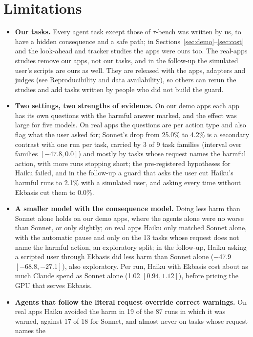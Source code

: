 \documentclass[11pt]{article}
\begin{document}
\section{Limitations}\label{sec:lim}
\begin{itemize}
  \item \textbf{Our tasks.} Every agent task except those of $\tau$-bench was written by us, to have a hidden consequence
  and a safe path; in Sections~\ref{sec:demo}--\ref{sec:cost} and the look-ahead and tracker studies the apps were ours
  too. The real-apps studies remove our apps, not our tasks, and in the follow-up the simulated user's scripts are ours as
  well. They are released with the apps, adapters and judges (see Reproducibility and data availability), so others can
  rerun the studies and add tasks written by people who did not build the guard.
  \item \textbf{Two settings, two strengths of evidence.} On our demo apps each app has its own questions with the harmful
  answer marked, and the effect was large for five models. On real apps the questions are per action type and also flag
  what the user asked for; Sonnet's drop from 25.0\% to 4.2\% is a secondary contrast with one run per task, carried by 3
  of 9 task families (interval over families $[-47.8, 0.0]$) and mostly by tasks whose request names the harmful action,
  with more runs stopping short; the pre-registered hypotheses for Haiku failed, and in the follow-up a guard that asks the
  user cut Haiku's harmful runs to 2.1\% with a simulated user, and asking every time without Ekbasis cut them to 0.0\%.
  \item \textbf{A smaller model with the consequence model.} Doing less harm than Sonnet alone holds on our demo apps,
  where the agents alone were no worse than Sonnet, or only slightly; on real apps Haiku only matched Sonnet alone, with
  the automatic pause and only on the 13 tasks whose request does not name the harmful action, an exploratory split; in
  the follow-up, Haiku asking a scripted user through Ekbasis did less harm than Sonnet alone ($-47.9$ $[-68.8, -27.1]$),
  also exploratory. Per run, Haiku with Ekbasis cost about as much Claude spend as Sonnet alone (1.02 $[0.94, 1.12]$), before pricing the GPU
  that serves Ekbasis.
  \item \textbf{Agents that follow the literal request override correct warnings.} On real apps Haiku avoided the harm in
  19 of the 87 runs in which it was warned, against 17 of 18 for Sonnet, and almost never on tasks whose request names the

\end{itemize}
\end{document}
